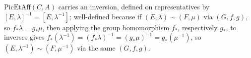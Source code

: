\begin{definition}[Inverse]
  \label{pa-def:PicEtAff_inv}
  \leanok

  \(\mathrm{PicEtAff}(C,A)\) carries an inversion, defined on representatives by
  \([E,\lambda]^{-1} = [E,\lambda^{-1}]\); well-defined because if \((E,\lambda) \sim (F,\mu)\)
  via \((G,f,g)\), so \(f_{*}\lambda = g_{*}\mu\), then applying the group homomorphism
  \(f_{*}\), respectively \(g_{*}\), to inverses gives \(f_{*}(\lambda^{-1}) =
  (f_{*}\lambda)^{-1} = (g_{*}\mu)^{-1} = g_{*}(\mu^{-1})\), so \((E,\lambda^{-1}) \sim
  (F,\mu^{-1})\) via the same \((G,f,g)\).
\end{definition}

